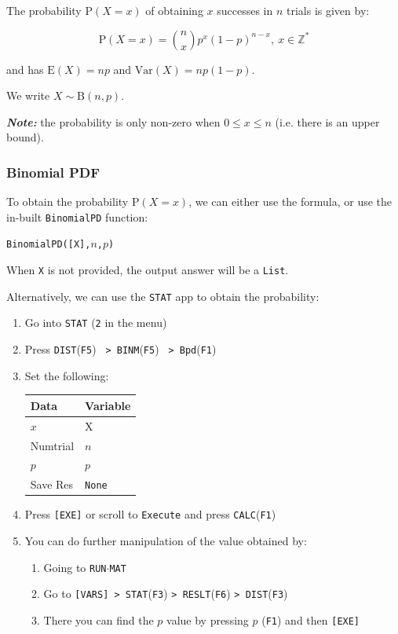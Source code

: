 \documentclass[a5paper]{memoir}
\def\code#1{\texttt{#1}}
\def\note#1{\textcolor[HTML]{109fa9}{\textbf{\textit{Note:}}} #1}
\def\runmat{\code{RUN$\cdot$MAT} }
\def\Fone{(\code{F1}) }
\def\Fthree{(\code{F3}) }
\def\Ffive{(\code{F5}) }
\def\Fsix{(\code{F6}) }
\newcommand{\addtoindex}[1]{#1\index{#1}}
\begin{document}
The probability $\textrm{P}(X = x)$ of obtaining $x$ successes in $n$ trials is given by:

\begin{equation}
	\mathrm{P}(X=x) = {n \choose x} p^x(1-p)^{n-x},~x \in \mathbb{Z}^*
\end{equation}

and has $\mathrm{E}(X) = np$ and $\mathrm{Var}(X)=np(1-p)$.

We write $X \sim \mathrm{B}(n, p)$.

\note{the probability is only non-zero when $0 \leq x \leq n$ (i.e. there is an upper bound).}

\subsubsection{Binomial PDF}

To obtain the probability $\textrm{P}(X = x)$, we can either use the formula, or use the in-built \code{\addtoindex{BinomialPD}} function:
\begin{center}
	\code{BinomialPD([X],$n$,$p$)}
\end{center}

When \code{X} is not provided, the output answer will be a \code{List}.

Alternatively, we can use the \code{STAT} app to obtain the probability:
\begin{enumerate}
	\item Go into \code{STAT} (\code{2} in the menu)
	\item Press \code{DIST}\Ffive\code{ > BINM}\Ffive\code{ > Bpd}\Fone
	\item Set the following:
	\begin{center}
		\setlength{\tabcolsep}{10pt}
		\renewcommand{\arraystretch}{1.1}
		\begin{tabular}{|l|l|}
			\hline
			Data		& Variable \\
			\hline
			$x$			& X \\
			\hline
			Numtrial	& $n$ \\
			\hline
			$p$			& $p$ \\
			\hline
			Save Res	& \code{None} \\
			\hline
		\end{tabular}
	\end{center}
	\item Press \code{[EXE]} or scroll to \code{Execute} and press \code{CALC}\Fone
	\item You can do further manipulation of the value obtained by:
	\begin{enumerate}
		\item Going to \runmat
		\item Go to \code{[VARS] > STAT}\Fthree\code{> RESLT}\Fsix\code{> DIST}\Fthree
		\item There you can find the $p$ value by pressing $p$ \Fone and then \code{[EXE]}
	\end{enumerate} 
\end{enumerate}
\end{document}
